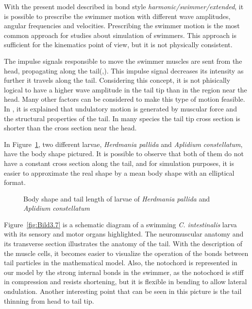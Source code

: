 With the present model described in bond style \textit{harmonic/swimmer/extended}, it is possible to prescribe the swimmer motion with different wave amplitudes, angular frequencies
and velocities. Prescribing the swimmer motion is the most common approach for studies about simulation of swimmers. This approach is sufficient for the kinematics point of view,
but it is not physically consistent.\par
The impulse signals responsible to move the swimmer muscles are sent from the head, propagating along the tail(\cite{jayne_muscular_1988},\cite{gillis_neuromuscular_1998}). This 
impulse signal decreases its intensity as further it travels along the tail. Considering this concept, it is not phisically logical to have a higher wave amplitude in the tail tip
than in the region near the head. Many other factors can be considered to make this type of motion feasible. In \cite{mchenry_morphology_2005}, it is explained that undulatory 
motion is generated by muscular force and the structural properties of the tail. In many species the tail tip cross section is shorter than the cross section near the head.\par
In Figure~\ref{fig:Bild3.6}, two different larvae, \textit{Herdmania pallida} and \textit{Aplidium constellatum}, have the body shape pictured. It is possible to observe that 
both of them do not have a constant cross section along the tail, and for simulation purposes, it is easier to approximate the real shape by a mean body shape with an elliptical
format. 



\begin{figure}[H]
\centering
  \begin{footnotesize}
  
  \caption[Body shape and tail length of larvae of \textit{Herdmania pallida} and \textit{Aplidium constellatum}\cite{mchenry_morphology_2005}]{Body shape and tail length of larvae of \textit{Herdmania pallida} and \textit{Aplidium constellatum}\cite{mchenry_morphology_2005}}
  \label{fig:Bild3.6}
  \end{footnotesize}
\end{figure} 

Figure~\ref{fig:Bild3.7} is a schematic diagram of a swimming \textit{C. intestinalis} larva with its sensory and motor organs highlighted. The neuromuscular anatomy and its 
transverse section illustrates the anatomy of the tail. With the description of the muscle cells, it becomes easier to visualize the operation of the bonds between tail particles
in the mathematical model. Also, the notochord is represented in our model by the strong internal bonds in the swimmer, as the notochord is stiff in compression and resists shortening,
but it is flexible in bending to allow lateral ondulation. Another interesting point that can be seen in this picture is the tail thinning from head to tail tip.


